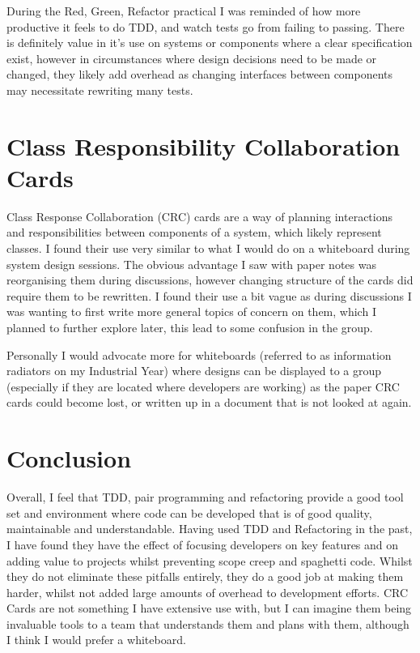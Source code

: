 \documentclass[10pt]{article}
\begin{document}
        During the Red, Green, Refactor practical I was reminded of how more productive it feels to do TDD, and watch tests go from failing to passing. There is definitely value in it's use on systems or components where a clear specification exist, however in circumstances where design decisions need to be made or changed, they likely add overhead as changing interfaces between components may necessitate rewriting many tests.
    
    \section{Class Responsibility Collaboration Cards}
        Class Response Collaboration (CRC) cards are a way of planning interactions and responsibilities between components of a system, which likely represent classes. I found their use very similar to what I would do on a whiteboard during system design sessions. The obvious advantage I saw with paper notes was reorganising them during discussions, however changing structure of the cards did require them to be rewritten. I found their use a bit vague as during discussions I was wanting to first write more general topics of concern on them, which I planned to further explore later, this lead to some confusion in the group.

        Personally I would advocate more for whiteboards (referred to as information radiators on my Industrial Year) where designs can be displayed to a group (especially if they are located where developers are working) as the paper CRC cards could become lost, or written up in a document that is not looked at again. 

    \section{Conclusion}

        Overall, I feel that TDD, pair programming and refactoring provide a good tool set and environment where code can be developed that is of good quality, maintainable and understandable. Having used TDD and Refactoring in the past, I have found they have the effect of focusing developers on key features and on adding value to projects whilst preventing scope creep and spaghetti code. Whilst they do not eliminate these pitfalls entirely, they do a good job at making them harder, whilst not added large amounts of overhead to development efforts. CRC Cards are not something I have extensive use with, but I can imagine them being invaluable tools to a team that understands them and plans with them, although I think I would prefer a whiteboard. 


\end{document}
